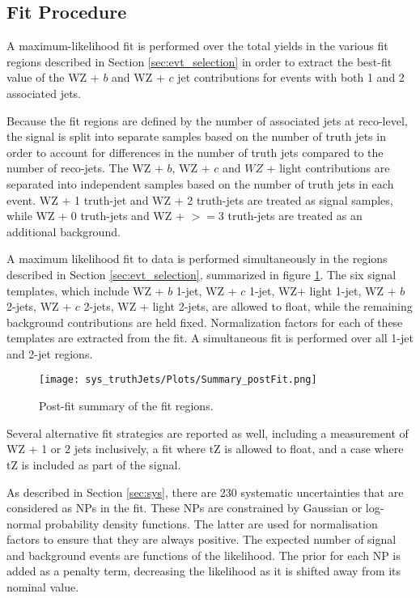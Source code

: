 
\subsection{Fit Procedure}
\label{sec:fit}

A maximum-likelihood fit is performed over the total yields in the various fit regions described in Section \ref{sec:evt_selection} in order to extract the best-fit value of the WZ + $b$ and WZ + $c$ jet contributions for events with both 1 and 2 associated jets.

Because the fit regions are defined by the number of associated jets at reco-level, the signal is split into separate samples based on the number of truth jets in order to account for differences in the number of truth jets compared to the number of reco-jets. The WZ + $b$, WZ + $c$ and $WZ$ + light contributions are separated into independent samples based on the number of truth jets in each event. WZ + 1 truth-jet and WZ + 2 truth-jets are treated as signal samples, while WZ + 0 truth-jets and WZ + $>=$3 truth-jets are treated as an additional background. 

A maximum likelihood fit to data is performed simultaneously in the regions described in Section \ref{sec:evt_selection}, summarized in figure \ref{fig:summary}. The six signal templates, which include WZ + $b$ 1-jet, WZ + $c$ 1-jet, WZ+ light 1-jet, WZ + $b$ 2-jets, WZ + $c$ 2-jets, WZ + light 2-jets, are allowed to float, while the remaining background contributions are held fixed. Normalization factors for each of these templates are extracted from the fit. A simultaneous fit is performed over all 1-jet and 2-jet regions.

\begin{figure}[H]
  \center                                                                                                                    
  \texttt{[image: sys\_truthJets/Plots/Summary\_postFit.png]}
  \caption{Post-fit summary of the fit regions.}
  \label{fig:summary}
\end{figure}

Several alternative fit strategies are reported as well, including a measurement of WZ + 1 or 2 jets inclusively, a fit where tZ is allowed to float, and a case where tZ is included as part of the signal.

As described in Section \ref{sec:sys}, there are 230 systematic uncertainties that are considered as NPs in the fit. These NPs are constrained by Gaussian or log-normal probability density functions. The latter are used for normalisation factors to ensure that they are always positive. The expected number of signal and background events are functions of the likelihood. The prior for each NP is added as a penalty term, decreasing the likelihood as it is shifted away from its nominal value.

